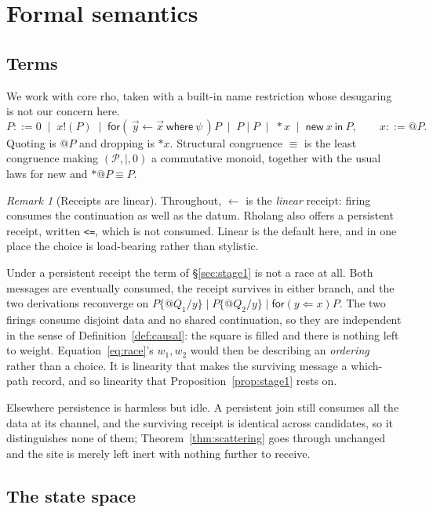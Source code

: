 \documentclass[11pt,a4paper]{article}
\theoremstyle{plain}
\theoremstyle{definition}
\theoremstyle{remark}
\newtheorem{remark}[theorem]{Remark}
\newcommand{\Proc}{\mathcal{P}}
\newcommand{\scong}{\equiv}
\begin{document}
\section{Formal semantics}\label{sec:semantics}

\subsection{Terms}

We work with core rho, taken with a built-in name restriction whose desugaring is
not our concern here.
\[
  P ::= 0 \;\mid\; x!(P) \;\mid\; \textsf{for}(\,\vec{y} \leftarrow \vec{x}
  \ \textsf{where}\ \psi\,)P \;\mid\; P \mid P \;\mid\; *x \;\mid\; \textsf{new}\ x\ \textsf{in}\ P,
  \qquad
  x ::= @P .
\]
Quoting is $@P$ and dropping is $*x$. Structural congruence $\scong$ is the least
congruence making $(\Proc, \mid, 0)$ a commutative monoid, together with the
usual laws for \textsf{new} and $*@P \scong P$.

\begin{remark}[Receipts are linear]\label{rem:linear}
Throughout, $\leftarrow$ is the \emph{linear} receipt: firing consumes the
continuation as well as the datum. Rholang also offers a persistent receipt,
written \texttt{<=}, which is not consumed. Linear is the default here, and in
one place the choice is load-bearing rather than stylistic.

Under a persistent receipt the term of \S\ref{sec:stage1} is not a race at all.
Both messages are eventually consumed, the receipt survives in either branch, and
the two derivations reconverge on
$P\{@Q_1/y\} \mid P\{@Q_2/y\} \mid \textsf{for}(y \Leftarrow x)P$. The two
firings consume disjoint data and no shared continuation, so they are independent
in the sense of Definition~\ref{def:causal}: the square is filled and there is
nothing left to weight. Equation~\eqref{eq:race}'s $w_1, w_2$ would then be
describing an \emph{ordering} rather than a choice. It is linearity that makes
the surviving message a which-path record, and so linearity that
Proposition~\ref{prop:stage1} rests on.

Elsewhere persistence is harmless but idle. A persistent join still consumes all
the data at its channel, and the surviving receipt is identical across
candidates, so it distinguishes none of them; Theorem~\ref{thm:scattering} goes
through unchanged and the site is merely left inert with nothing further to
receive.
\end{remark}

\subsection{The state space}
\end{document}
